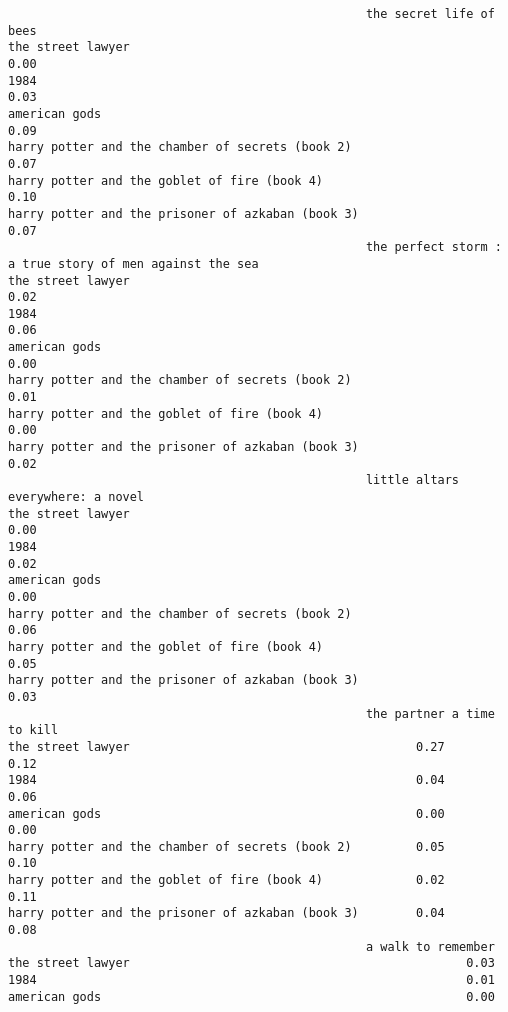 \documentclass[
]{report}
\begin{document}
\begin{verbatim}
                                                  the secret life of bees
the street lawyer                                                    0.00
1984                                                                 0.03
american gods                                                        0.09
harry potter and the chamber of secrets (book 2)                     0.07
harry potter and the goblet of fire (book 4)                         0.10
harry potter and the prisoner of azkaban (book 3)                    0.07
                                                  the perfect storm : a true story of men against the sea
the street lawyer                                                                                    0.02
1984                                                                                                 0.06
american gods                                                                                        0.00
harry potter and the chamber of secrets (book 2)                                                     0.01
harry potter and the goblet of fire (book 4)                                                         0.00
harry potter and the prisoner of azkaban (book 3)                                                    0.02
                                                  little altars everywhere: a novel
the street lawyer                                                              0.00
1984                                                                           0.02
american gods                                                                  0.00
harry potter and the chamber of secrets (book 2)                               0.06
harry potter and the goblet of fire (book 4)                                   0.05
harry potter and the prisoner of azkaban (book 3)                              0.03
                                                  the partner a time to kill
the street lawyer                                        0.27           0.12
1984                                                     0.04           0.06
american gods                                            0.00           0.00
harry potter and the chamber of secrets (book 2)         0.05           0.10
harry potter and the goblet of fire (book 4)             0.02           0.11
harry potter and the prisoner of azkaban (book 3)        0.04           0.08
                                                  a walk to remember
the street lawyer                                               0.03
1984                                                            0.01
american gods                                                   0.00

\end{verbatim}
\end{document}
